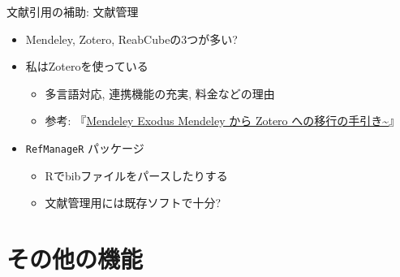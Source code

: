 \documentclass[
  14pt,
  ignorenonframetext,
]{beamer}
\providecommand{\tightlist}{%
  \setlength{\itemsep}{0pt}\setlength{\parskip}{0pt}}
\begin{document}
\begin{frame}[fragile]{文献引用の補助: 文献管理}
\protect\hypertarget{ux6587ux732eux5f15ux7528ux306eux88dcux52a9-ux6587ux732eux7ba1ux7406}{}

\begin{itemize}
\tightlist
\item
  Mendeley, Zotero, ReabCubeの3つが多い?
\item
  私はZoteroを使っている

  \begin{itemize}
  \tightlist
  \item
    多言語対応, 連携機能の充実, 料金などの理由
  \item
    参考:
    『\href{https://ill-identified.hatenablog.com/entry/2019/03/05/195257}{Mendeley
    Exodus Mendeley から Zotero への移行の手引き\textasciitilde{}}』
  \end{itemize}
\item
  \texttt{RefManageR} パッケージ

  \begin{itemize}
  \tightlist
  \item
    Rでbibファイルをパースしたりする
  \item
    文献管理用には既存ソフトで十分?
  \end{itemize}
\end{itemize}

\end{frame}

\hypertarget{ux305dux306eux4ed6ux306eux6a5fux80fd}{%
\section{その他の機能}\label{ux305dux306eux4ed6ux306eux6a5fux80fd}}
\end{document}
